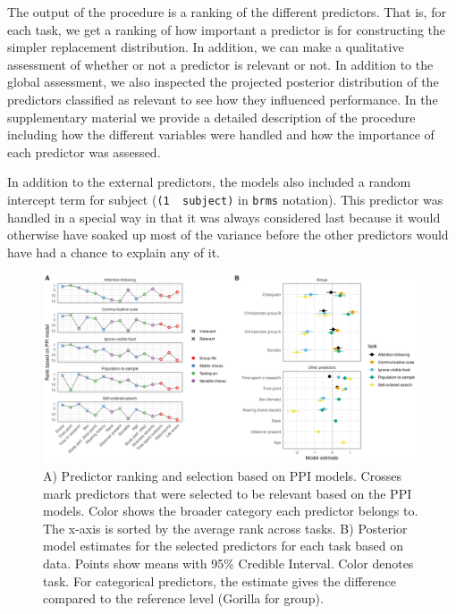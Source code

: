 \documentclass[
  man,floatsintext]{apa6}
\begin{document}
The output of the procedure is a ranking of the different predictors. That is, for each task, we get a ranking of how important a predictor is for constructing the simpler replacement distribution. In addition, we can make a qualitative assessment of whether or not a predictor is relevant or not. In addition to the global assessment, we also inspected the projected posterior distribution of the predictors classified as relevant to see how they influenced performance. In the supplementary material we provide a detailed description of the procedure including how the different variables were handled and how the importance of each predictor was assessed.

In addition to the external predictors, the models also included a random intercept term for subject (\texttt{(1\ \textbar{}\ subject)} in \texttt{brms} notation). This predictor was handled in a special way in that it was always considered last because it would otherwise have soaked up most of the variance before the other predictors would have had a chance to explain any of it.

\begin{figure}

{\centering \includegraphics[width=1\linewidth]{../visuals/pred_sum} 

}

\caption{A) Predictor ranking and selection based on PPI models. Crosses mark predictors that were selected to be relevant based on the PPI models. Color shows the broader category each predictor belongs to. The x-axis is sorted by the average rank across tasks. B) Posterior model estimates for the selected predictors for each task based on data. Points show means with 95\% Credible Interval. Color denotes task. For categorical predictors, the estimate gives the difference compared to the reference level (Gorilla for group).}\label{fig:figpred}
\end{figure}
\end{document}
